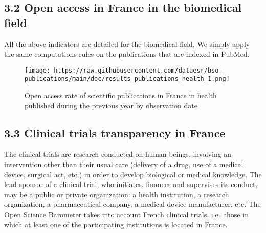 \documentclass[
]{article}
\begin{document}
\newpage

\hypertarget{open-access-in-france-in-the-biomedical-field}{%
\subsection{3.2 Open access in France in the biomedical
field}\label{open-access-in-france-in-the-biomedical-field}}

All the above indicators are detailed for the biomedical field. We
simply apply the same computations rules on the publications that are
indexed in PubMed.

\begin{figure}
\centering
\texttt{[image: https://raw.githubusercontent.com/dataesr/bso-publications/main/doc/results\_publications\_health\_1.png]}
\caption{Open access rate of scientific publications in France in health
published during the previous year by observation date}
\end{figure}

\hypertarget{clinical-trials-transparency-in-france}{%
\subsection{3.3 Clinical trials transparency in
France}\label{clinical-trials-transparency-in-france}}

The clinical trials are research conducted on human beings, involving an
intervention other than their usual care (delivery of a drug, use of a
medical device, surgical act, etc.) in order to develop biological or
medical knowledge. The lead sponsor of a clinical trial, who initiates,
finances and supervises its conduct, may be a public or private
organization: a health institution, a research organization, a
pharmaceutical company, a medical device manufacturer, etc. The Open
Science Barometer takes into account French clinical trials, i.e.~those
in which at least one of the participating institutions is located in
France.
\end{document}
